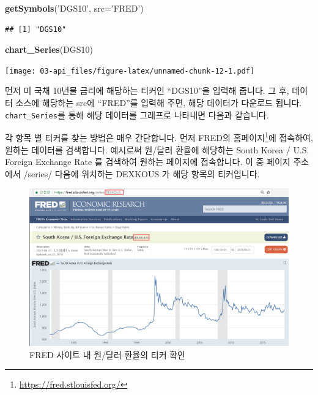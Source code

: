 \documentclass[]{book}
\newenvironment{Shaded}{\begin{snugshade}}{\end{snugshade}}
\newcommand{\DataTypeTok}[1]{\textcolor[rgb]{0.13,0.29,0.53}{#1}}
\newcommand{\KeywordTok}[1]{\textcolor[rgb]{0.13,0.29,0.53}{\textbf{#1}}}
\newcommand{\NormalTok}[1]{#1}
\newcommand{\StringTok}[1]{\textcolor[rgb]{0.31,0.60,0.02}{#1}}
\let\rmarkdownfootnote\footnote%
\def\footnote{\protect\rmarkdownfootnote}
\begin{document}
\begin{Shaded}
\begin{Highlighting}[]
\KeywordTok{getSymbols}\NormalTok{(}\StringTok{'DGS10'}\NormalTok{, }\DataTypeTok{src=}\StringTok{'FRED'}\NormalTok{)}
\end{Highlighting}
\end{Shaded}

\begin{verbatim}
## [1] "DGS10"
\end{verbatim}

\begin{Shaded}
\begin{Highlighting}[]
\KeywordTok{chart_Series}\NormalTok{(DGS10)}
\end{Highlighting}
\end{Shaded}

\texttt{[image: 03-api\_files/figure-latex/unnamed-chunk-12-1.pdf]}

먼저 미 국채 10년물 금리에 해당하는 티커인 ``DGS10''을 입력해 줍니다. 그 후, 데이터 소스에 해당하는 src에 ``FRED''를 입력해 주면, 해당 데이터가 다운로드 됩니다. \texttt{chart\_Series}를 통해 해당 데이터를 그래프로 나타내면 다음과 같습니다.

각 항목 별 티커를 찾는 방법은 매우 간단합니다. 먼저 FRED의 홈페이지\footnote{\url{https://fred.stlouisfed.org/}}에 접속하여, 원하는 데이터를 검색합니다. 예시로써 원/달러 환율에 해당하는 South Korea / U.S. Foreign Exchange Rate 를 검색하여 원하는 페이지에 접속합니다. 이 중 페이지 주소에서 /series/ 다음에 위치하는 DEXKOUS 가 해당 항목의 티커입니다.

\begin{figure}

{\centering \includegraphics{images/api_fred} 

}

\caption{FRED 사이트 내 원/달러 환율의 티커 확인}\label{fig:unnamed-chunk-13}
\end{figure}
\end{document}
